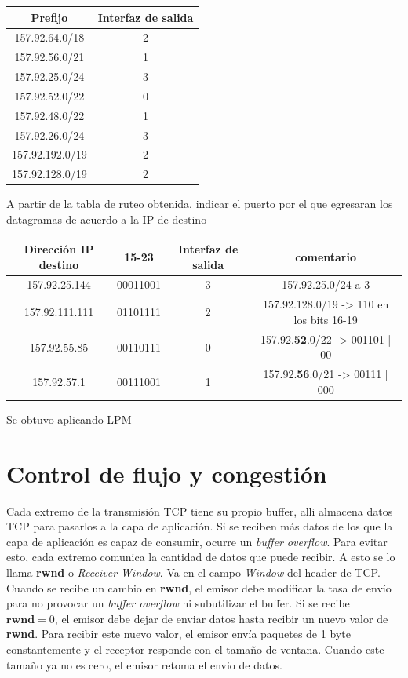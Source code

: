 \documentclass[titlepage,a4paper]{article}
\begin{document}
\begin{center}
    \begin{tabular}{c|c}
        Prefijo & Interfaz de salida  \\
        \hline
        \hline
        157.92.64.0/18 & 2\\
        \hline
        157.92.56.0/21 & 1\\ 
        \hline
        157.92.25.0/24 & 3\\ 
        \hline
        157.92.52.0/22 & 0\\ 
        \hline
        157.92.48.0/22 & 1\\ 
        \hline
        157.92.26.0/24 & 3\\ 
        \hline
        157.92.192.0/19 & 2\\ 
        \hline
        157.92.128.0/19 & 2\\ 
    \end{tabular}
\end{center}


A partir de la tabla de ruteo obtenida, indicar el puerto por el que egresaran los datagramas de acuerdo a la IP de destino 

\begin{center}
    \begin{tabular}{c|c|c|c}
        Dirección IP destino & 15-23 &  Interfaz de salida  & comentario\\
        \hline
        \hline
        157.92.25.144 & 00011001 & 3 &  157.92.25.0/24 a 3 \\
        157.92.111.111 & 01101111 & 2 & 157.92.128.0/19 -> 110 en los bits 16-19 \\
        157.92.55.85 & 00110111 & 0 & 157.92.\textbf{52}.0/22 -> 001101 | 00 \\
        157.92.57.1 & 00111001 & 1 & 157.92.\textbf{56}.0/21 -> 00111 | 000 \\
    \end{tabular}
\end{center}

Se obtuvo aplicando LPM
\section{Control de flujo y congestión}

Cada extremo de la transmisión TCP tiene su propio buffer, alli almacena datos TCP para pasarlos a la capa de aplicación. Si se reciben más datos de los que la capa de aplicación es capaz de consumir, ocurre un \textit{buffer overflow}. Para evitar esto, cada extremo comunica la cantidad de datos que puede recibir. A esto se lo llama \textbf{rwnd} o \textit{Receiver Window}. Va en el campo \textit{Window} del header de TCP.
Cuando se recibe un cambio en \textbf{rwnd}, el emisor debe modificar la tasa de envío para no provocar un \textit{buffer overflow} ni subutilizar el buffer. 
Si se recibe $\textbf{rwnd} = 0 $, el emisor debe dejar de enviar datos hasta recibir un nuevo valor de \textbf{rwnd}. Para recibir este nuevo valor, el emisor envía paquetes de 1 byte constantemente y el receptor responde con el tamaño de ventana. Cuando este tamaño ya no es cero, el emisor retoma el envio de datos.
\end{document}

